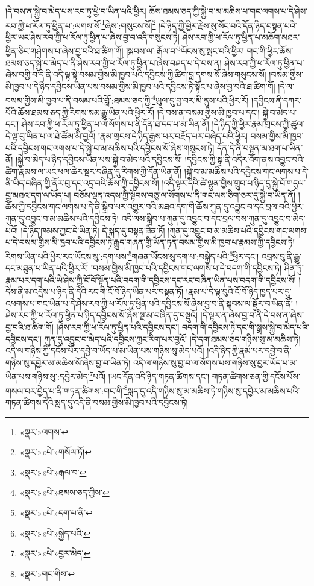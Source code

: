 །དེ་བས་ན་སྐྱེ་བ་མེད་པས་རབ་ཏུ་ཕྱེ་བ་ཡིན་པའི་ཕྱིར། ཆོས་ཐམས་ཅད་ཀྱི་སྐྱེ་བ་མ་མཆིས་པ་གང་ལགས་པ་དེ་ཤེས་རབ་ཀྱི་ཕ་རོལ་ཏུ་ཕྱིན་པ་:ལགས་སོ་\footnote{«སྣར་»ལགས་}ཞེས་:གསུངས་སོ།\footnote{«སྣར་»«པེ་»གསོལ་ཏོ།} །དེ་ཉིད་ཀྱི་ཕྱིར་རྗེས་སུ་སོང་བའི་དོན་ཉིད་བསྟན་པའི་ཕྱིར་ཡང་ཤེས་རབ་ཀྱི་ཕ་རོལ་ཏུ་ཕྱིན་པ་ཞེས་བྱ་བ་འདི་གསུངས་ཏེ། ཤེས་རབ་ཀྱི་ཕ་རོལ་ཏུ་ཕྱིན་པ་མཆོག་མཐར་ཕྱིན་ཅིང་གཤེགས་པ་ཞེས་བྱ་བའི་ཐ་ཚིག་གོ། །སྐབས་ལ་:རྒོལ་བ་\footnote{«སྣར་»«པེ་»རྒལ་བ་}ཡོངས་སུ་སྤང་བའི་ཕྱིར། གང་གི་ཕྱིར་ཆོས་ཐམས་ཅད་སྐྱེ་བ་མེད་པ་ནི་ཤེས་རབ་ཀྱི་ཕ་རོལ་ཏུ་ཕྱིན་པ་ཞེས་བཤད་པ་དེ་བས་ན། ཤེས་རབ་ཀྱི་ཕ་རོལ་ཏུ་ཕྱིན་པ་ཞེས་བགྱི་བ་དེ་ནི་འདི་ལྟ་སྟེ་བསམ་གྱིས་མི་ཁྱབ་པའི་དབྱིངས་ཀྱི་ཚིག་བླ་དགས་སོ་ཞེས་གསུངས་སོ། །བསམ་གྱིས་མི་ཁྱབ་པ་དེ་ཉིད་དབྱིངས་ཡིན་པས་བསམ་གྱིས་མི་ཁྱབ་པའི་དབྱིངས་ཏེ་སྟོང་པ་ཞེས་བྱ་བའི་ཐ་ཚིག་གོ། །དེ་ལ་བསམ་གྱིས་མི་ཁྱབ་པ་ནི་བསམ་པའི་བློ་:ཐམས་ཅད་ཀྱི་\footnote{«སྣར་»«པེ་»ཐམས་ཅད་ཀྱིས་}ཡུལ་དུ་བྱ་བར་མི་ནུས་པའི་ཕྱིར་རོ། །དབྱིངས་ནི་དཀར་པོའི་ཆོས་ཐམས་ཅད་ཀྱི་རིགས་སམ་རྒྱུ་ཡིན་པའི་ཕྱིར་རོ། །དེ་བས་ན་བསམ་གྱིས་མི་ཁྱབ་པ་དང་། སྐྱེ་བ་མེད་པ་དང་། ཤེས་རབ་ཀྱི་ཕ་རོལ་ཏུ་ཕྱིན་པ་ལ་སོགས་པ་ནི་དོན་ཐ་དད་པ་མ་ཡིན་ནོ། །དེ་ཉིད་ཀྱི་ཕྱིར་རྣམ་གྲངས་ཀྱི་ཚུལ་དེ་ལྟ་བུ་ཡིན་པ་ལ་ཐེ་ཚོམ་མི་བྱའོ། །རྣམ་གྲངས་དེ་ཉིད་རྒྱས་པར་བརྗོད་པར་བཞེད་པའི་ཕྱིར། བསམ་གྱིས་མི་ཁྱབ་པའི་དབྱིངས་གང་ལགས་པ་དེ་སྐྱེ་བ་མ་མཆིས་པའི་དབྱིངས་སོ་ཞེས་གསུངས་ཏེ། དོན་དེ་ནི་བསྟན་མ་ཐག་པ་ཡིན་ནོ། །སྐྱེ་བ་མེད་པ་ཉིད་དབྱིངས་ཡིན་པས་སྐྱེ་བ་མེད་པའི་དབྱིངས་སོ། །དབྱིངས་ཀྱི་སྒྲ་ནི་འདིར་འོག་ནས་འབྱུང་བའི་ཚིག་རྣམས་ལ་ཡང་ཕལ་ཆེར་སྔར་བཞིན་དུ་རིགས་ཀྱི་དོན་ཡིན་ནོ། །སྐྱེ་བ་མ་མཆིས་པའི་དབྱིངས་གང་ལགས་པ་དེ་ནི་ཡིད་བཞིན་གྱི་ནོར་བུ་དང་འདྲ་བའི་ཆོས་ཀྱི་དབྱིངས་སོ། །འདི་ལྟར་དེའི་ཚེ་ལྷུན་གྱིས་གྲུབ་པ་ཉིད་དུ་སྐྱེ་བོ་གདུལ་བྱ་མཐའ་དག་ལ་ཡོད་པ། བཅོམ་ལྡན་འདས་ཀྱི་སྟོབས་བཅུ་ལ་སོགས་པ་ནི་གང་ལས་ཅིག་ཅར་དུ་སྐྱེ་བ་ཡིན་ནོ། །ཆོས་ཀྱི་དབྱིངས་གང་ལགས་པ་དེ་ནི་སྒྲིབ་པར་འགྱུར་བའི་མཐའ་དག་གི་ཆོས་ཀུན་དུ་འབྱུང་བ་དང་བྲལ་བའི་ཕྱིར་ཀུན་དུ་འབྱུང་བ་མ་མཆིས་པའི་དབྱིངས་ཏེ། འདི་ལས་སྒྲིབ་པ་ཀུན་དུ་འབྱུང་བ་དང་བྲལ་བས་ཀུན་དུ་འབྱུང་བ་མེད་པའོ། །དེ་ཉིད་ཁམས་ཀྱང་དེ་ཡིན་ཏེ། དེ་སྐད་དུ་བསྟན་ཟིན་ཏོ། །ཀུན་དུ་འབྱུང་བ་མ་མཆིས་པའི་དབྱིངས་གང་ལགས་པ་དེ་བསམ་གྱིས་མི་ཁྱབ་པའི་དབྱིངས་ཏེ་རྒྱུད་གཞན་གྱི་ཡོན་ཏན་བསམ་གྱིས་མི་ཁྱབ་པ་རྣམས་ཀྱི་དབྱིངས་ཏེ། རིགས་ཡིན་པའི་ཕྱིར་རང་ཡོངས་སུ་:དག་པས་\footnote{«སྣར་»«པེ་»དག་པ་ནི་}གཞན་ཡོངས་སུ་དག་པ་:བསྐྱེད་པའི་\footnote{«སྣར་»«པེ་»སྐྱེད་པའི་}ཕྱིར་དང་། འབྲས་བུ་ནི་རྒྱུ་དང་མཐུན་པ་ཡིན་པའི་ཕྱིར་རོ། །བསམ་གྱིས་མི་ཁྱབ་པའི་དབྱིངས་གང་ལགས་པ་དེ་བདག་གི་དབྱིངས་ཏེ། ཤིན་ཏུ་རྣམ་པར་དག་པའི་ཡེ་ཤེས་ཀྱི་ངོ་བོ་སྟོན་པའི་བདག་གི་དབྱིངས་དང་རང་བཞིན་ཡིན་པས་བདག་གི་དབྱིངས་སོ། །དེས་ནི་མ་འདྲེས་པ་ཉིད་ནི་དེའི་རང་གི་ངོ་བོ་ཉིད་ཡིན་པར་བསྟན་ཏོ། །རྣམ་པ་དེ་ལྟ་བུའི་ངོ་བོ་ཉིད་ཁྱད་པར་དུ་འཕགས་པ་གང་ཡིན་པ་དེ་ཤེས་རབ་ཀྱི་ཕ་རོལ་ཏུ་ཕྱིན་པའི་དབྱིངས་སོ་ཞེས་བྱ་བ་ནི་སྐབས་ལ་སྦྱོར་བ་ཡིན་ནོ། །ཤེས་རབ་ཀྱི་ཕ་རོལ་ཏུ་ཕྱིན་པ་ཉིད་དབྱིངས་སོ་ཞེས་སྔ་མ་བཞིན་དུ་བསྡུའོ། །དེ་ལྟར་ན་ཞེས་བྱ་བ་ནི་དེ་བས་ན་ཞེས་བྱ་བའི་ཐ་ཚིག་གོ། །ཤེས་རབ་ཀྱི་ཕ་རོལ་ཏུ་ཕྱིན་པའི་དབྱིངས་དང་། བདག་གི་དབྱིངས་ཏེ་དང་གི་སྒྲས་སྐྱེ་བ་མེད་པའི་དབྱིངས་དང་། ཀུན་དུ་འབྱུང་བ་མེད་པའི་དབྱིངས་ཀྱང་རིག་པར་བྱའོ། །དེ་དག་ཐམས་ཅད་གཉིས་སུ་མ་མཆིས་ཏེ། འདི་ལ་གཉིས་ཀྱི་དངོས་པོར་དབྱེ་བ་ཡོད་པ་མ་ཡིན་པས་གཉིས་སུ་མེད་པའོ། །འདི་ཉིད་ཀྱི་རྣམ་པར་དབྱེ་བ་ནི་གཉིས་སུ་དབྱེར་མ་མཆིས་སོ་ཞེས་བྱ་བ་ཡིན་ཏེ། འདི་ལ་གཉིས་སུ་བྱ་བ་ལ་སོགས་པས་གཉིས་སུ་བྱར་ཡོད་པ་མ་ཡིན་པས་གཉིས་སུ་:དབྱེར་མེད་\footnote{«སྣར་»«པེ་»བྱར་མེད་}པའོ། །ཡང་དོན་འདི་ཉིད་གཏན་ཚིགས་དང་། གཏན་ཚིགས་ཅན་གྱི་དངོས་པོས་གསལ་བར་བྱེད་པ་ནི་གཏན་ཚིགས་:གང་གི་\footnote{«སྣར་»གང་གིས་}སླད་དུ་འདི་གཉིས་སུ་མ་མཆིས་ཏེ་གཉིས་སུ་དབྱེར་མ་མཆིས་པའི་གཏན་ཚིགས་དེའི་སླད་དུ་འདི་ནི་བསམ་གྱིས་མི་ཁྱབ་པའི་དབྱིངས་ཏེ། 